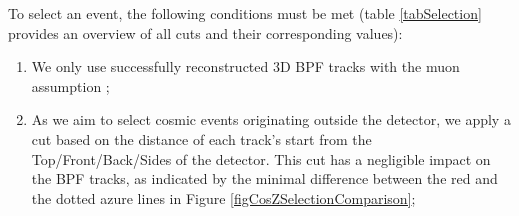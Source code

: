 \documentclass[12pt]{article}
\begin{document}
To select an event, the following conditions must be met (table \ref{tabSelection} provides an overview of all cuts and their corresponding values):
\begin{enumerate}
\item We only use successfully reconstructed 3D BPF tracks with the muon assumption \cite{NOVA-doc-32455-v1};
\item As we aim to select cosmic events originating outside the detector, we apply a cut based on the distance of each track's start from the Top/Front/Back/Sides of the detector. This cut has a negligible impact on the BPF tracks, as indicated by the minimal difference between the red and the dotted azure lines in Figure \ref{figCosZSelectionComparison};

\begin{figure}[!ht]


\end{figure}
\end{enumerate}
\end{document}
